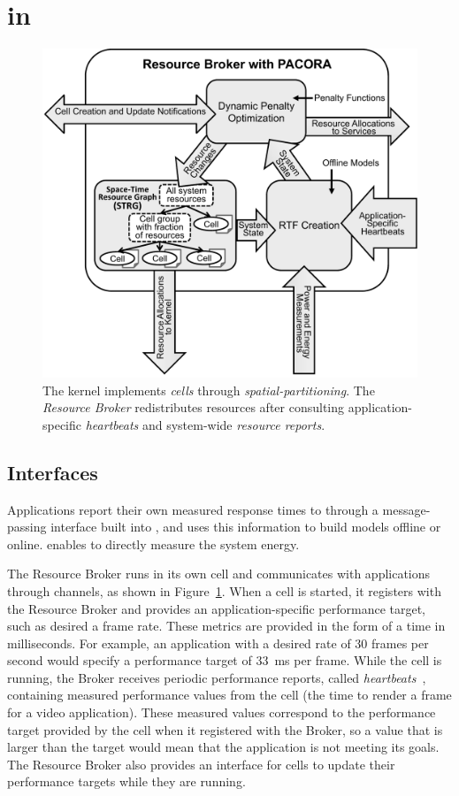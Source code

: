\section{\pacora in \tess}{

\begin{figure}[t]
\centering
\includegraphics[width=0.885\linewidth]{Figures/pacora-in-tess}
\caption{
The \tess kernel implements \emph{cells} through \emph{spatial-partitioning}.
The \emph{Resource Broker} redistributes resources after consulting application-specific
\emph{heartbeats} and system-wide \emph{resource reports}.
}
\label{fig:tess-arch}
\end{figure}

\subsection{Interfaces}
Applications report their own measured response times to \pacora
through a message-passing interface built into \tess, and \pacora uses
this information to build models offline or online. 
\tess enables \pacora to directly measure the system energy.

The Resource Broker runs in its own cell and communicates with
applications through channels, as shown in Figure~\ref{fig:tess-arch}.
When a cell is started, it registers with the Resource Broker and provides
an application-specific performance target, such as desired a
frame rate.  
These metrics are provided in the form of a time in milliseconds.  
For example, an application with a desired rate of
30 frames per second would specify a performance target of 33~ms
per frame.  While the cell is running, the Broker receives periodic
performance reports, called \emph{heartbeats}~\cite{hoffmann2011}, containing
measured performance values from the cell (\eg the time to render a
frame for a video application).  These measured values correspond to the
performance target provided by the cell when it registered with the
Broker, so a value that is larger than the target would mean that the
application is not meeting its goals.  The Resource Broker also provides
an interface for cells to update their performance targets while they are running.

}
